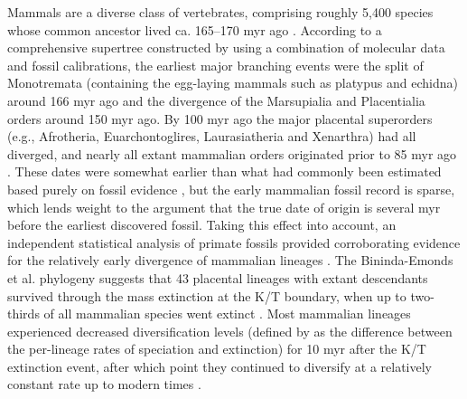 Mammals are a diverse class of vertebrates, comprising roughly 5,400
species whose common ancestor lived ca. 165--170 \ac{myr} ago
\citep{Wilson2005}. According to a comprehensive supertree constructed
by \citet{BinindaEmonds2007} using a combination of molecular data and
fossil calibrations, the earliest major branching events were the
split of Monotremata (containing the egg-laying mammals such as
platypus and echidna) around 166 \ac{myr} ago and the divergence of
the Marsupialia and Placentialia orders around 150 \ac{myr} ago. By
100 \ac{myr} ago the major placental superorders (e.g., Afrotheria,
Euarchontoglires, Laurasiatheria and Xenarthra) had all diverged, and
nearly all extant mammalian orders originated prior to 85 \ac{myr} ago
\citep{BinindaEmonds2007}. These dates were somewhat earlier than what
had commonly been estimated based purely on fossil evidence
\citep{Archibald2001}, but the early mammalian fossil record is
sparse, which lends weight to the argument that the true date of
origin is several \ac{myr} before the earliest discovered
fossil. Taking this effect into account, an independent statistical
analysis of primate fossils provided corroborating evidence for the
relatively early divergence of mammalian lineages
\citep{Martin2007}. The Bininda-Emonds et al. phylogeny suggests that
43 placental lineages with extant descendants survived through the
mass extinction at the K/T boundary, when up to two-thirds of all
mammalian species went extinct \citep{Alroy1999}. Most mammalian
lineages experienced decreased diversification levels (defined by
\citet{BinindaEmonds2007} as the difference between the per-lineage
rates of speciation and extinction) for 10 \ac{myr} after the K/T
extinction event, after which point they continued to diversify at a
relatively constant rate up to modern times
\citep{BinindaEmonds2007,Martin2007}.

